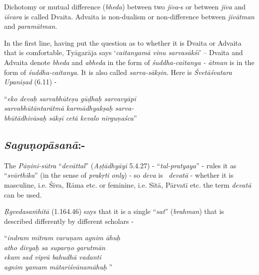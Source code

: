 Dichotomy or mutual difference (\textit{bheda}) between two \textit{jīva}-s or between \textit{jīva} and \textit{īśvara} is called Dvaita. Advaita is non-dualism or non-difference between \textit{jīvātman} and \textit{paramātman}. 

In the first line, having put the question as to whether it is Dvaita or Advaita that is comfortable, Tyāgarāja says ‘\textit{caitanyamā vinu sarvasākśī}’ – Dvaita and Advaita denote \textit{bheda} and \textit{abheda} in the form of \textit{śuddha-caitanya - ātman} is in the form of \textit{śuddha-caitanya}. It is also called \textit{sarva-sākṣin}. Here is \textit{Śvetāśvatara Upaniṣad} (6.11) -

\begin{centerquote}
“\textit{eko devaḥ sarvabhūteṣu gūḍhaḥ sarvavyāpī}\\ \textit{sarvabhūtāntarātmā karmādhyakṣaḥ sarva-}\\ \textit{bhūtādhivāsaḥ sākṣī cetā kevalo nirguṇaśca}”
\end{centerquote}

\vspace{-.3cm}

\subsection*{\textit{Saguṇopāsanā}:-}

The \textit{Pāṇini-sūtra} “\textit{devāttal}” (\textit{Aṣṭādhyāyī} 5.4.27) - “\textit{tal-pratyaya}” - rules it as “\textit{svārthika}” (in the sense of \textit{prakṛti only}) - so \textit{deva} is  \textit{devatā} - whether it is masculine, i.e. Śiva, Rāma etc. or feminine, i.e. Sītā\textit{,} Pārvatī etc. the term \textit{devatā} can be used. 

\textit{Ṛgvedasaṁhitā} (1.164.46) says that it is a single “\textit{sat}” (\textit{brahman}) that is described differently by different scholars -

\begin{centerquote}
“\textit{indram mitram varuṇam agnim āhuḥ}\\ \textit{atho divyaḥ sa suparṇo garutmān} \\ \textit{ekam sad viprā bahudhā vadanti}\\ \textit{agnim yamam mātariśvānamāhuḥ} ”
\end{centerquote}

